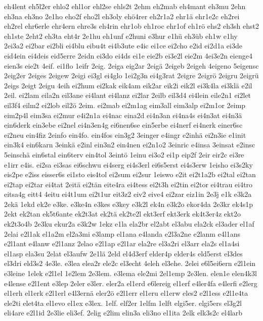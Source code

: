 {eh4lent
eh5l2er
ehlo2
ehl1or
ehl2se
ehls2t
2ehm
eh2mab
eh4mant
eh3mu
2ehn
eh3na
eh3no
2e1ho
eho2f
eho2l
eh3oly
ehö4rer
eh2r1a2
ehr1ä
ehr1e2c
eh2rei
eh2rel
ehr6erle
ehr4ern
ehre3s
eh4rin
ehr1ob
eh1roc
ehr1of
eh1rö
ehs2
eh3sh
ehst2
eh1ste
2eht2
eh3ta
eht4r
2e1hu
eh1unf
e2huni
e3hur
e1hü
eh3üb
eh1w
e1hy
2ei3a2
ei2bar
ei2bli
ei4blu
eibu4t
ei4b3ute
e4ic
ei1ce
ei2cho
e2id
ei2d1a
ei3de
eid4ein
ei4deis
eid5erre
2eidn
ei3do
ei4ds
ei1e
eie2b
ei3e2l
eie2m
4ei3e2n
eienge4
eien3s
eie2t
4eif.
ei1flo
1eifr
2eig.
2eiga
eig2ar
2eigä
2eigeb
2eigeh
4eigeno
5eigensc
2eig2er
2eiges
2eigew
2eigi
ei3gl
ei4glo
1ei2g3n
ei4g3rat
2eigre
2eigrö
2eigru
2eigrü
2eigs
2eigt
2eigu
4eih
ei2hum
ei2kak
eik4am
eik2ar
eik2i
eik2l
ei3k4la
ei3klä
e2il
2eil.
ei2lam
eila2n
eil3ane
ei4lant
ei4lanz
ei2lar
2eilb
eil3d4
ei4lein
eile2n1
ei2let
eil3f4
eilm2
ei2lob
eil2ö
2eim.
ei2mab
ei2m1ag
eim3all
eim3alp
ei2m1or
2eimp
eim2p4l
eim3sa
ei2mur
e4i2n1a
ei4nac
eina2d
ei4n3an
ei4na4s
ei4n3at
ei4n3ä
ein6derk
ein3ebe
ei2nel
ei4n3en4g
ei6nen6se
ein5erbe
ei4nerf
ei4nerk
einer6sc
ei2neu
ein4fiz
2einfo
ein4fo.
ein4fos
ein3g2
3einger
e4ingr
e2inhä
ei2n3ie
e1init
ein3k4
ein6karn
3einkä
e2inl
ein3n2
ein4nen
ei2n1o2
3einric
e4insa
3einsat
e2insc
5einschä
ein6stal
ein6terv
ein4tol
3eintö
1einu
ei3o2
ei1p
eip2f
2eir
eir2c
ei3re
e1irr
e4is.
ei2sa
ei3sas
ei6schwu
ei4serg
ei4s3erl
ei6s5erst
ei4s3erw
1eisho
ei3s2ky
eis2pe
e2iss
eisser6s
ei1sto
eis4tol
ei2sum
ei2sur
1eiswo
e2it
ei2t1a2b
ei2tal
ei2tan
ei2tap
ei2tar
ei4tat
2eitä
ei2tän
eite4ra
ei4tess
ei2t3h
ei2tin
ei2tor
ei4trau
ei4tro
eitsa4g
eitt4
4eitu
ei4t1um
ei2t1ur
eit3z2
eiv2
eive4
ei2zar
eiz1in
2e3j
e1k
e3k2a
2ekä
1ekd
ek2e
e3ke.
e3ke4n
e3kes
e3key
e3k2l
ek4n
e3k2o
ekor4da
2e3kr
ek4s1p
2ekt
ek2tan
ek5t6ante
ek2t3at
ek2tä
ek2te2l
ekt3erf
ekt3erk
ek4t3er4z
ekt2o
ek2t3o4b
2e3ku
ekur2a
e3k2w
1ekz
e1la
ela2br
el2abt
el3abu
ela2ck
el3ader
el1af
2elai
e2l1ak
el1a2m
el2a3mi
e3lamp
el1ana
e4landa
e2l3a2ne
e2lanm
e4l1ans
e2l1ant
e4lanw
e2l1anz
2elao
e2l1ap
e2l1ar
ela2re
el3a2ri
el3arr
ela2s
el1a4si
el1asp
ela3su
2elat
el3aufw
2e1lä
2eld
el4d3erf
elder4p
elder4s
eld5erst
el3des
el3dri
eld3s2
4e3le.
e3lea
elea2r
ele2c
el3echt
4eleh
el3ehe.
2elei
e6l5ei6ern
e2l1ein
e3leine
1elek
e2l1el
1e2lem
2e3lem.
e3lema
ele2mi
2el1emp
2e3len.
elen1e
elen4k3l
e4lense
e2l1ent
e3lep
2eler
e3ler.
eler2a
el1erd
e6lereig
el1erf
e4ler4fa
e4lerfi
e2lerg
el1erh
el1erk
e2l1erl
e4l3ernä
eler2ö
e2l1err
el1eru
el1erw
eles2
e2l1ess
e2l1e4ta
ele2ti
elet4ta
el1evo
el1ex
e3lex.
1elf.
elf2er
1elfm
1elft
elgi5er.
elgi5ers
el3g2l
eli4are
e2l1id
2e3lie
eli3ef.
2elig
e2lim
elin3a
eli3no
el1ita
2elk
elk3s2c
el4larb
}
